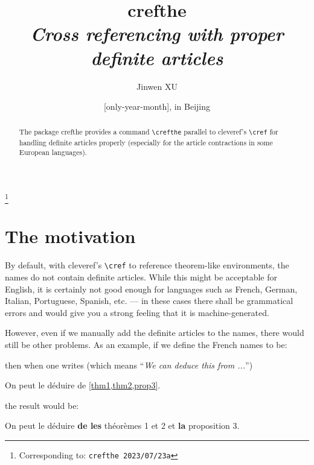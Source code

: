 \documentclass[classical]{einfart}
\newenvironment{demo}
  {%
    \LocallyStopLineNumbers%
    \begin{tcolorbox}[enhanced jigsaw,pad at break*=1mm,breakable,
        left=2.5mm,right=3mm,top=0.5mm,bottom=0mm,
        colback=gray!5!paper,boxrule=0pt,frame hidden,
        borderline west={1.2mm}{0mm}{gray!55!paper},arc=.7mm]%
  }
  {%
    \end{tcolorbox}%
    \ResumeLineNumbers%
  }
\newcommand{\crefthepackage}{\textsf{crefthe}}
\begin{document}
\def\PackageVersion{2023/07/23}
\def\PackageSubVersion{a}

\title{\crefthepackage{}\\\smallskip\itshape Cross referencing with proper definite articles}
\author{Jinwen XU}
\thanks{Corresponding to: \texttt{\crefthepackage{} \PackageVersion\PackageSubVersion}}
\date{\TheDate{\PackageVersion}[only-year-month], in Beijing}

\maketitle

\begin{abstract}
    \raggedleft
    The package \crefthepackage{} provides a command \lstinline|\crefthe| parallel to \textsf{cleveref}'s \lstinline|\cref| for handling definite articles properly (especially for the article contractions in some European languages).
\end{abstract}

\section{The motivation}

By default, with \textsf{cleveref}'s \lstinline|\cref| to reference theorem-like environments, the names do not contain definite articles. While this might be acceptable for English, it is certainly not good enough for languages such as French, German, Italian, Portuguese, Spanish, etc. --- in these cases there shall be grammatical errors and would give you a strong feeling that it is machine-generated.

However, even if we manually add the definite articles to the names, there would still be other problems. As an example, if we define the French names to be:

\begin{code}
\end{code}

then when one writes (which means ``\emph{We can deduce this from ...}'')

\begin{code}
On peut le déduire de \cref{thm1,thm2,prop3}.
\end{code}

the result would be:

\begin{demo}
    On peut le déduire \textbf{de les} théorèmes 1 et 2 et \textbf{la} proposition 3.
\end{demo}
\end{document}
